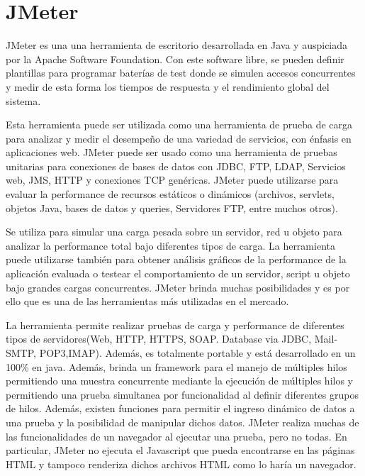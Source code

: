 \documentclass[a4paper,12pt]{report}
\begin{document}
\chapter{JMeter}
JMeter es una una herramienta de escritorio desarrollada en Java y auspiciada por la Apache Software Foundation. Con este software libre, se pueden definir plantillas para programar baterías de test donde se simulen accesos concurrentes y medir de esta forma los tiempos de respuesta y el rendimiento global del sistema.

Esta herramienta puede ser utilizada como una herramienta de prueba de carga para analizar y medir el desempeño de una variedad de servicios, con énfasis en aplicaciones web.
JMeter puede ser usado como una herramienta de pruebas unitarias para conexiones de bases de datos con JDBC, FTP, LDAP, Servicios web, JMS, HTTP y conexiones TCP genéricas. 
JMeter puede utilizarse para evaluar la performance de recursos estáticos o dinámicos (archivos, servlets, objetos Java, bases de datos y queries, Servidores FTP, entre muchos otros). 

Se utiliza para simular una carga pesada sobre un servidor, red u objeto para analizar la performance total bajo diferentes tipos de carga. La herramienta puede utilizarse también para obtener análisis gráficos de la performance de la aplicación evaluada o testear el comportamiento de un servidor, script u objeto bajo grandes cargas concurrentes.
JMeter brinda muchas posibilidades y es por ello que es una de las herramientas más utilizadas en el mercado.

La herramienta permite realizar pruebas de carga y performance de diferentes tipos de servidores(Web, HTTP, HTTPS, SOAP. Database via JDBC, Mail-SMTP, POP3,IMAP). Además, es totalmente portable y está desarrollado en un 100\% en java. Además, brinda un framework para el manejo de múltiples hilos permitiendo una muestra concurrente mediante la ejecución de múltiples hilos y permitiendo una prueba simultanea por funcionalidad al definir diferentes grupos de hilos. Además, existen funciones para permitir el ingreso dinámico de datos a una prueba y la posibilidad de manipular dichos datos.
JMeter realiza muchas de las funcionalidades de un navegador al ejecutar una prueba, pero no todas. En particular, JMeter no ejecuta el Javascript que pueda encontrarse en las páginas HTML y tampoco renderiza dichos archivos HTML como lo haría un navegador.


  
\end{document}
